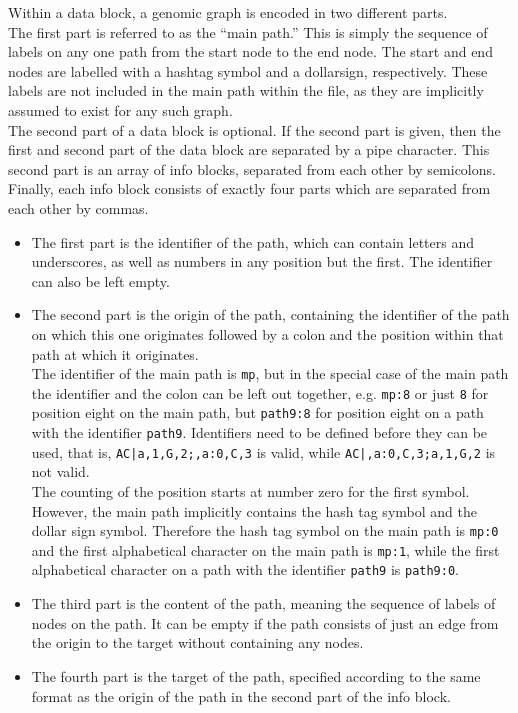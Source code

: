 \documentclass[a4paper,12pt,twoside,BCOR=10mm]{scrbook}
\begin{document}
Within a data block, a genomic graph is encoded in two different parts. \\
The first part is referred to as the “main path.” 
This is simply the sequence of labels on any one path from the start node 
to the end node. The start and end nodes are labelled with a hashtag symbol and a dollarsign, respectively. 
These labels are not included in the main path within the file, as they are implicitly assumed 
to exist for any such graph. \\
The second part of a data block is optional. 
If the second part is given, then the first and second part of the data block are separated by a pipe character. 
This second part is an array of info blocks, separated from each other by semicolons. \\
Finally, each info block consists of exactly four parts which are separated from each other by commas.
\begin{itemize}
\item The first part is the identifier of the path, which can contain letters and underscores, 
as well as numbers in any position but the first. 
The identifier can also be left empty.
\item The second part is the origin of the path, 
containing the identifier of the path on which this one 
originates followed by a colon and the position within that path 
at which it originates. \\
The identifier of the main path is \texttt{mp}, but in the special case of the main path the 
identifier and the colon can be left out together, e.g. \texttt{mp:8} or just \texttt{8} for position eight 
on the main path, but \texttt{path9:8} for position eight on a path with the identifier \texttt{path9}.
Identifiers need to be defined before they can be used, that 
is, \texttt{AC|a,1,G,2;,a:0,C,3} is valid, while \texttt{AC|,a:0,C,3;a,1,G,2} is not valid. \\
The counting of the position starts at number zero for the first symbol. 
However, the main path implicitly contains the hash tag symbol and the dollar sign symbol. 
Therefore the hash tag symbol on the main path is \texttt{mp:0} and 
the first alphabetical character on the main path is \texttt{mp:1}, 
while the first alphabetical character on a path with the identifier \texttt{path9} is \texttt{path9:0}.
\item The third part is the content of the path, meaning the sequence of labels of nodes on the path. 
It can be empty if the path consists of just an edge from the origin to the target without containing any nodes.
\item The fourth part is the target of the path, 
specified according to the same format as the origin of the path in the second part of the info block.
\end{itemize}
\end{document}
